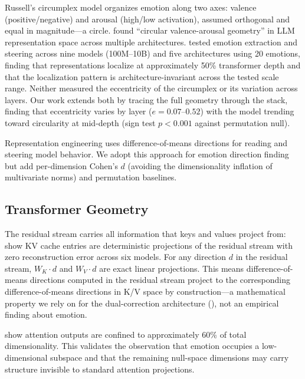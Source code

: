 \documentclass[11pt,a4paper]{article}
\begin{document}
Russell's circumplex model \citep{russell1980circumplex} organizes
emotion along two axes: valence (positive/negative) and arousal
(high/low activation), assumed orthogonal and equal in magnitude---a
circle. \citet{sun2026valence} found ``circular valence-arousal
geometry'' in LLM representation space across multiple architectures.
\citet{jeong2026emotion} tested emotion extraction and steering across
nine models (100M--10B) and five architectures using 20 emotions,
finding that representations localize at approximately 50\% transformer
depth and that the localization pattern is architecture-invariant across
the tested scale range. Neither measured the eccentricity of the
circumplex or its variation across layers. Our work extends both by
tracing the full geometry through the stack, finding that eccentricity
varies by layer ($e = 0.07\text{--}0.52$) with the model trending toward
circularity at mid-depth (sign test $p < 0.001$ against permutation
null).

Representation engineering \citep{zou2023representation} uses
difference-of-means directions for reading and steering model behavior.
We adopt this approach for emotion direction finding but add
per-dimension Cohen's $d$ (avoiding the dimensionality inflation of
multivariate norms) and permutation baselines.

\subsection{Transformer Geometry}

The residual stream carries all information that keys and values project
from: \citet{qasim2026residual} show KV cache entries are deterministic
projections of the residual stream with zero reconstruction error across
six models. For any direction $d$ in the residual stream, $W_K \cdot d$
and $W_V \cdot d$ are exact linear projections. This means
difference-of-means directions computed in the residual stream project to
the corresponding difference-of-means directions in K/V space by
construction---a mathematical property we rely on for the dual-correction
architecture (), not an empirical finding about emotion.

\citet{wang2025dimensional} show attention outputs are confined to
approximately 60\% of total dimensionality. This validates the
observation that emotion occupies a low-dimensional subspace and that the
remaining null-space dimensions may carry structure invisible to standard
attention projections.
\end{document}
